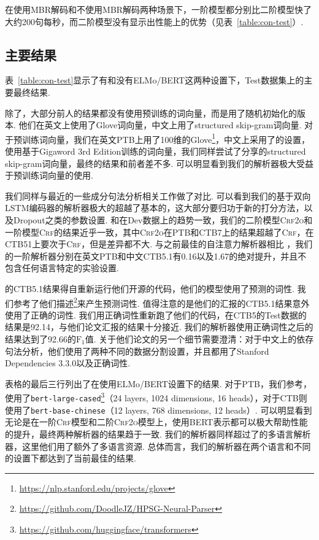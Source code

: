 在使用MBR解码和不使用MBR解码两种场景下，一阶模型都分别比二阶模型快了大约200句每秒，而二阶模型没有显示出性能上的优势（见表~\ref{table:con-test}）.



\subsection{主要结果}
表~\ref{table:con-test}显示了有和没有ELMo/BERT这两种设置下，Test数据集上的主要最终结果.

除了\citet{zhou-zhao-2019-head}，大部分前人的结果都没有使用预训练的词向量，而是用了随机初始化的版本.
他们在英文上使用了Glove词向量，中文上用了structured skip-gram词向量.
对于预训练词向量，我们在英文PTB上用了100维的Glove\footnote{\url{https://nlp.stanford.edu/projects/glove}}，中文上采用了\citet{li-etal-2019-attentive}的设置，使用基于Gigaword 3rd Edition训练的词向量，我们同样尝试了\citet{zhou-zhao-2019-head}分享的structured skip-gram词向量，最终的结果和前者差不多.
可以明显看到我们的解析器极大受益于预训练词向量的使用.

我们同样与最近的一些成分句法分析相关工作做了对比.
可以看到我们的基于双向LSTM编码器的解析器极大的超越了基本的\citet{stern-etal-2017-minimal}，这大部分要归功于新的打分方法，以及Dropout之类的参数设置.
和在Dev数据上的趋势一致，我们的二阶模型\textsc{Crf2o}和一阶模型\textsc{Crf}的结果近乎一致，其中\textsc{Crf2o}在PTB和CTB7上的结果超越了\textsc{Crf}，在CTB51上要次于\textsc{Crf}，但是差异都不大.
与之前最佳的自注意力解析器相比 \citep{kitaev-klein-2018-constituency}，我们的一阶解析器分别在英文PTB和中文CTB5.1有0.16以及1.67的绝对提升，并且不包含任何语言特定的实验设置.

\citet{zhou-zhao-2019-head}的CTB5.1结果得自重新运行他们开源的代码，他们的模型使用了预测的词性.
我们参考了他们描述\footnote{\url{https://github.com/DoodleJZ/HPSG-Neural-Parser}}来产生预测词性.
值得注意的是他们的汇报的CTB5.1结果意外使用了正确的词性.
我们用正确词性重新跑了他们的代码，在CTB5的Test数据的结果是92.14，与他们论文汇报的结果十分接近.
我们的解析器使用正确词性之后的结果达到了92.66的$\mathrm{F}_1$值.
关于他们论文的另一个细节需要澄清：对于中文上的依存句法分析，他们使用了两种不同的数据分割设置，并且都用了Stanford Dependencies 3.3.0以及正确词性.

表格的最后三行列出了在使用ELMo/BERT设置下的结果.
对于PTB，我们参考\citet{kitaev-etal-2019-multilingual}，使用了\texttt{bert-large-cased}\footnote{\url{https://github.com/huggingface/transformers}}（24 layers, 1024 dimensions, 16 heads），对于CTB则使用了\texttt{bert-base-chinese}（12 layers, 768 dimensions, 12 heads）.
可以明显看到无论是在一阶\textsc{Crf}模型和二阶\textsc{Crf2o}模型上，使用BERT表示都可以极大帮助性能的提升，最终两种解析器的结果趋于一致.
我们的解析器同样超过了\citet{kitaev-etal-2019-multilingual}的多语言解析器，这里他们用了额外了多语言资源.
总体而言，我们的解析器在两个语言和不同的设置下都达到了当前最佳的结果.

